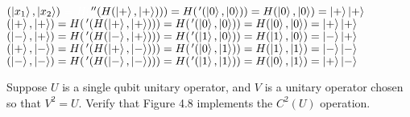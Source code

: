 \begin{center}
\textcolor{white}{\CNOT}$(\ket{x_1},\ket{x_2})$\textcolor{white}{$ = H($\CNOT$''(H(\ket{+},\ket{+}))) = H($\CNOT$'(\ket{0},\ket{0})) = H(\ket{0},\ket{0}) = \ket{+}\ket{+}$}
\CNOT$(\ket{+},\ket{+}) = H($\CNOT$'(H(\ket{+},\ket{+}))) = H($\CNOT$'(\ket{0},\ket{0})) = H(\ket{0},\ket{0}) = \ket{+}\ket{+}$
\CNOT$(\ket{-},\ket{+}) = H($\CNOT$'(H(\ket{-},\ket{+}))) = H($\CNOT$'(\ket{1},\ket{0})) = H(\ket{1},\ket{0}) = \ket{-}\ket{+}$ %
\CNOT$(\ket{+},\ket{-}) = H($\CNOT$'(H(\ket{+},\ket{-}))) = H($\CNOT$'(\ket{0},\ket{1})) = H(\ket{1},\ket{1}) = \ket{-}\ket{-}$
\CNOT$(\ket{-},\ket{-}) = H($\CNOT$'(H(\ket{-},\ket{-}))) = H($\CNOT$'(\ket{1},\ket{1})) = H(\ket{0},\ket{1}) = \ket{+}\ket{-}$ %
\end{center}
 Suppose $U$ is a single qubit unitary operator, and $V$ is a unitary operator chosen so that $V^2=U$.  Verify that Figure 4.8 implements the $C^2(U)$ operation.
